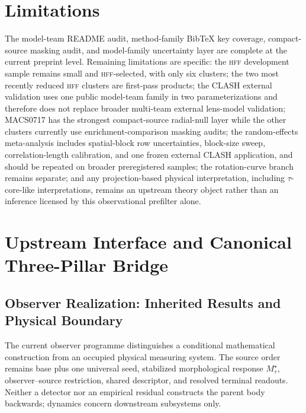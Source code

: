 \documentclass[11pt,a4paper]{article}
\newcommand{\HFF}{\textsc{hff}}
\begin{document}
\section{Limitations}

The model-team README audit,
method-family BibTeX key coverage, compact-source masking audit, and
model-family uncertainty layer are complete at the current preprint
level. Remaining limitations are specific: the \HFF{} development sample remains
small and \HFF{}-selected, with only six clusters; the two most recently reduced
\HFF{} clusters are first-pass products; the CLASH external validation uses
one public model-team family in two parameterizations and therefore does not
replace broader multi-team external lens-model validation; MACS0717 has the
strongest compact-source radial-null layer while the other clusters currently
use enrichment-comparison masking audits; the random-effects
meta-analysis includes spatial-block row uncertainties, block-size sweep,
correlation-length calibration, and one frozen external CLASH application, and
should be repeated on broader preregistered samples; the
rotation-curve branch remains separate; and any projection-based physical
interpretation, including \(\tau\)-core-like interpretations, remains an upstream
theory object rather than an inference licensed by this observational prefilter alone.

\section{Upstream Interface and Canonical Three-Pillar Bridge}
\label{sec:upstream-interface}

\subsection{Observer Realization: Inherited Results and Physical Boundary}
\label{sec:observer-update-20260914}
The current observer programme distinguishes a conditional mathematical
construction from an occupied physical measuring system. The source order
remains base plus one universal seed, stabilized morphological response
$M_\tau^\star$, observer--source restriction, shared descriptor, and resolved
terminal readouts. Neither a detector nor an empirical residual constructs the
parent body backwards; dynamics concern downstream subsystems only.
\end{document}
